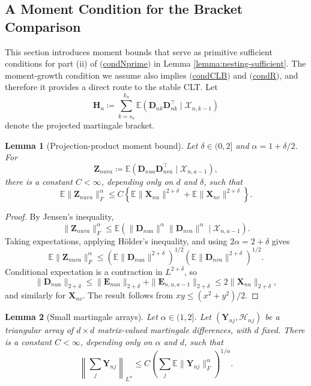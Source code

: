 \documentclass[11pt]{article}
\renewcommand\vec[1]{\boldsymbol{#1}}
\newcommand\mat[1]{\mathbf{#1}}
\newcommand{\E}{\mathbb{E}}
\newcommand{\Hcal}{\mathcal{H}}
\newcommand{\X}{\mathcal{X}}
\newcommand{\refitem}[1]{$\mathrm{(}$\hyperlink{cond:#1}{\csname cond#1\endcsname}$\mathrm{)}$}
\newtheorem{lemma}{Lemma}
\theoremstyle{definition}
\begin{document}
\subsection{A Moment Condition for the Bracket Comparison}\label{sec:moment-bracket-comparison}

This section introduces moment bounds that serve as primitive sufficient conditions for part (ii) of \refitem{Nprime} in Lemma \ref{lemma:nesting-sufficient}.
The moment-growth condition we assume also implies \refitem{CLB} and \refitem{R}, and therefore it provides a direct route to the stable CLT.
Let
\[
\mat{H}_n
\coloneqq
\sum_{k=s_n}^{k_n}
\E(\vec{D}_{nk}\vec{D}_{nk}^{\top}\mid\X_{n,k-1})
\]
denote the projected martingale bracket.

\begin{lemma}[Projection-product moment bound]\label{lemma:projection-product}
Let \(\delta\in(0,2]\) and \(\alpha=1+\delta/2\).
For
\[
\mat{Z}_{nuva}
\coloneqq
\E\left(
\vec{D}_{nua}\vec{D}_{nva}^{\top}
\mid \X_{n,a-1}
\right),
\]
there is a constant \(C<\infty\), depending only on \(d\) and \(\delta\), such that
\[
\E\|\mat{Z}_{nuva}\|_F^\alpha
\leq
C\left\{
\E\|\vec{X}_{nu}\|^{2+\delta}
+
\E\|\vec{X}_{nv}\|^{2+\delta}
\right\}.
\]
\end{lemma}

\begin{proof}
By Jensen's inequality,
\[
\|\mat{Z}_{nuva}\|_F^\alpha
\leq
\E\left(
\|\vec{D}_{nua}\|^\alpha
\|\vec{D}_{nva}\|^\alpha
\mid \X_{n,a-1}
\right).
\]
Taking expectations, applying H\"older's inequality, and using \(2\alpha=2+\delta\) gives
\[
\E\|\mat{Z}_{nuva}\|_F^\alpha
\leq
\left(\E\|\vec{D}_{nua}\|^{2+\delta}\right)^{1/2}
\left(\E\|\vec{D}_{nva}\|^{2+\delta}\right)^{1/2}.
\]
Conditional expectation is a contraction in \(L^{2+\delta}\), so
\[
\|\vec{D}_{nua}\|_{2+\delta}
\leq
\|\vec{E}_{nua}\|_{2+\delta}
+
\|\vec{E}_{n,u,a-1}\|_{2+\delta}
\leq
2\|\vec{X}_{nu}\|_{2+\delta},
\]
and similarly for \(\vec{X}_{nv}\).
The result follows from \(xy\leq (x^2+y^2)/2\).
\end{proof}

\begin{lemma}[Small martingale arrays]\label{lemma:small-md}
Let \(\alpha\in(1,2]\).
Let \((\mat{Y}_{nj},\Hcal_{nj})\) be a triangular array of \(d\times d\) matrix-valued martingale differences, with \(d\) fixed.
There is a constant \(C<\infty\), depending only on \(\alpha\) and \(d\), such that
\[
\left\|\sum_j\mat{Y}_{nj}\right\|_{L^\alpha}
\leq
C\left(\sum_j\E\|\mat{Y}_{nj}\|_F^\alpha\right)^{1/\alpha}.
\]
\end{lemma}
\end{document}
